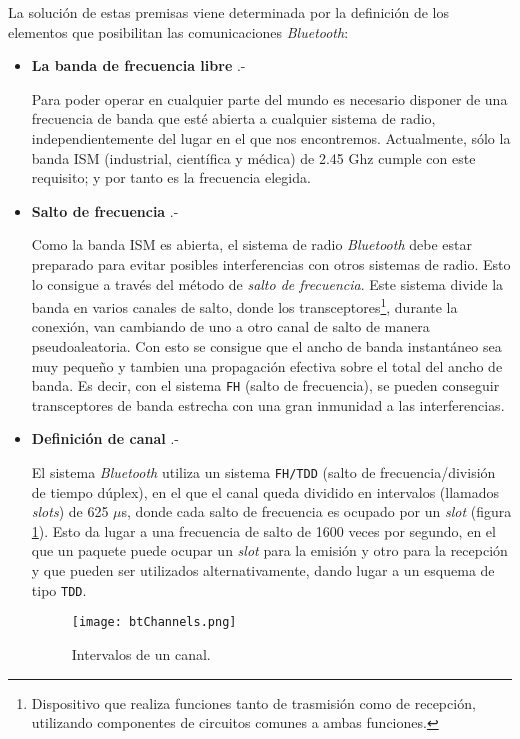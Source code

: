 La solución de estas premisas viene determinada por la definición de los
elementos que posibilitan las comunicaciones \emph{Bluetooth}:

\begin{itemize}
\item \textbf{La banda de frecuencia libre} .-

Para poder operar en cualquier parte del mundo es necesario disponer de una
frecuencia de banda que esté abierta a cualquier sistema de radio,
independientemente del lugar en el que nos encontremos. Actualmente, sólo la
banda \acs{ISM} (industrial, científica y médica) de 2.45 Ghz cumple con
este requisito; y por tanto es la frecuencia elegida.

\item \textbf{Salto de frecuencia} .-

Como la banda \acs{ISM} es abierta, el sistema de radio \emph{Bluetooth} debe
estar preparado para evitar posibles interferencias con otros sistemas de
radio. Esto lo consigue a través del método de \emph{salto de frecuencia}.
Este sistema divide la banda en varios canales de salto, donde los
transceptores\footnote{Dispositivo que realiza funciones tanto de trasmisión
como de recepción, utilizando componentes de circuitos comunes a ambas
funciones.}, durante la conexión, van cambiando de uno a otro canal de
salto de manera pseudoaleatoria. Con esto se consigue que el ancho de banda
instantáneo sea muy pequeño y tambien una propagación efectiva sobre el
total del ancho de banda. Es decir, con el sistema \texttt{FH} (salto de
frecuencia), se pueden conseguir transceptores de banda estrecha con una
gran inmunidad a las interferencias.

\item \textbf{Definición de canal} .-

El sistema \emph{Bluetooth} utiliza un sistema \texttt{FH/TDD} (salto de
frecuencia/división de tiempo dúplex), en el que el canal queda dividido en
intervalos (llamados \emph{slots}) de 625 $\mu$s, donde cada salto de
frecuencia es ocupado por un \emph{slot} (figura \ref{fig:btChannels}). Esto
da lugar a una frecuencia de salto de 1600 veces por segundo, en el que un
paquete puede ocupar un \emph{slot} para la emisión y otro para la recepción y
que pueden ser utilizados alternativamente, dando lugar a un esquema de tipo
\texttt{TDD}.

  \begin{figure}[H]
    \begin{center}
      \texttt{[image: btChannels.png]}
      \caption{Intervalos de un canal.}
      \label{fig:btChannels}
    \end{center}
  \end{figure}


\end{itemize}
